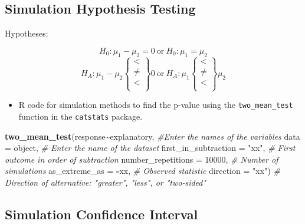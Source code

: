 \documentclass[
]{report}
\newenvironment{Shaded}{\begin{snugshade}}{\end{snugshade}}
\newcommand{\AttributeTok}[1]{\textcolor[rgb]{0.13,0.29,0.53}{#1}}
\newcommand{\CommentTok}[1]{\textcolor[rgb]{0.56,0.35,0.01}{\textit{#1}}}
\newcommand{\DecValTok}[1]{\textcolor[rgb]{0.00,0.00,0.81}{#1}}
\newcommand{\FunctionTok}[1]{\textcolor[rgb]{0.13,0.29,0.53}{\textbf{#1}}}
\newcommand{\NormalTok}[1]{#1}
\newcommand{\SpecialCharTok}[1]{\textcolor[rgb]{0.81,0.36,0.00}{\textbf{#1}}}
\newcommand{\StringTok}[1]{\textcolor[rgb]{0.31,0.60,0.02}{#1}}
\providecommand{\tightlist}{%
  \setlength{\itemsep}{0pt}\setlength{\parskip}{0pt}}
\begin{document}
\subsection*{Simulation Hypothesis Testing}\label{simulation-hypothesis-testing-1}

Hypotheses:

\[H_0: \mu_1 - \mu_2 = 0 ~ \text{or}~ H_0: \mu_1 = \mu_2 \]
\[H_A: \mu_1 - \mu_2 \left\{
\begin{array}{ll}
< \\
\ne \\
< \\
\end{array}
\right\}
0 
~ \text{or} ~ H_A:
\mu_1 \left\{
\begin{array}{ll}
< \\
\ne \\
< \\
\end{array}
\right\}
\mu_2 \]

\begin{itemize}
\tightlist
\item
  R code for simulation methods to find the p-value using the \texttt{two\_mean\_test} function in the \texttt{catstats} package.
\end{itemize}

\begin{Shaded}
\begin{Highlighting}[]
\FunctionTok{two\_mean\_test}\NormalTok{(response}\SpecialCharTok{\textasciitilde{}}\NormalTok{explanatory, }\CommentTok{\#Enter the names of the variables }
               \AttributeTok{data =}\NormalTok{ object,  }\CommentTok{\# Enter the name of the dataset}
              \AttributeTok{first\_in\_subtraction =} \StringTok{"xx"}\NormalTok{, }\CommentTok{\# First outcome in order of subtraction }
               \AttributeTok{number\_repetitions =} \DecValTok{10000}\NormalTok{,  }\CommentTok{\# Number of simulations }
               \AttributeTok{as\_extreme\_as =} \SpecialCharTok{{-}}\NormalTok{xx,  }\CommentTok{\# Observed statistic }
               \AttributeTok{direction =} \StringTok{"xx"}\NormalTok{)  }\CommentTok{\# Direction of alternative: "greater", "less", or "two{-}sided"}
\end{Highlighting}
\end{Shaded}

\subsection*{Simulation Confidence Interval}\label{simulation-confidence-interval-1}
\end{document}
